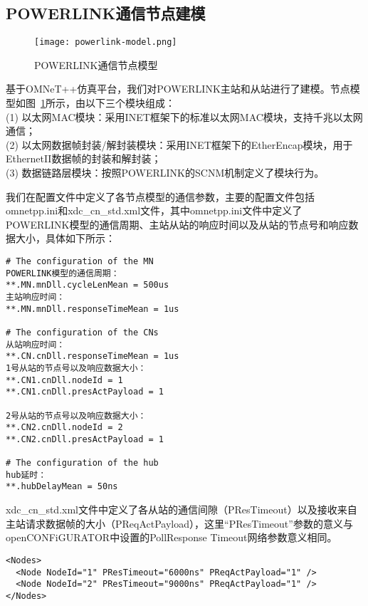 \subsection{POWERLINK通信节点建模}

\begin{figure}[!htb]
  \centering
  \texttt{[image: powerlink-model.png]}
  \caption{POWERLINK通信节点模型}
  \label{fig:powerlink-model}
\end{figure}
基于OMNeT++仿真平台，我们对POWERLINK主站和从站进行了建模。节点模型如图~\ref{fig:powerlink-model}所示，由以下三个模块组成：\\
(1) 以太网MAC模块：采用INET框架下的标准以太网MAC模块，支持千兆以太网通信；\\
(2) 以太网数据帧封装/解封装模块：采用INET框架下的EtherEncap模块，用于EthernetII数据帧的封装和解封装；\\
(3) 数据链路层模块：按照POWERLINK的SCNM机制定义了模块行为。

我们在配置文件中定义了各节点模型的通信参数，主要的配置文件包括omnetpp.ini和xdc\_cn\_std.xml文件，其中omnetpp.ini文件中定义了POWERLINK模型的通信周期、主站从站的响应时间以及从站的节点号和响应数据大小，具体如下所示：

\begin{lstlisting}
# The configuration of the MN
POWERLINK模型的通信周期：
**.MN.mnDll.cycleLenMean = 500us
主站响应时间：
**.MN.mnDll.responseTimeMean = 1us

# The configuration of the CNs
从站响应时间：
**.CN.cnDll.responseTimeMean = 1us
1号从站的节点号以及响应数据大小：
**.CN1.cnDll.nodeId = 1
**.CN1.cnDll.presActPayload = 1

2号从站的节点号以及响应数据大小：
**.CN2.cnDll.nodeId = 2
**.CN2.cnDll.presActPayload = 1

# The configuration of the hub
hub延时：
**.hubDelayMean = 50ns
\end{lstlisting}


xdc\_cn\_std.xml文件中定义了各从站的通信间隙（PResTimeout）以及接收来自主站请求数据帧的大小（PReqActPayload），这里“PResTimeout”参数的意义与openCONFiGURATOR中设置的PollResponse Timeout网络参数意义相同。
\begin{lstlisting}
<Nodes>
  <Node NodeId="1" PResTimeout="6000ns" PReqActPayload="1" />
  <Node NodeId="2" PResTimeout="9000ns" PReqActPayload="1" />
</Nodes>
\end{lstlisting}



